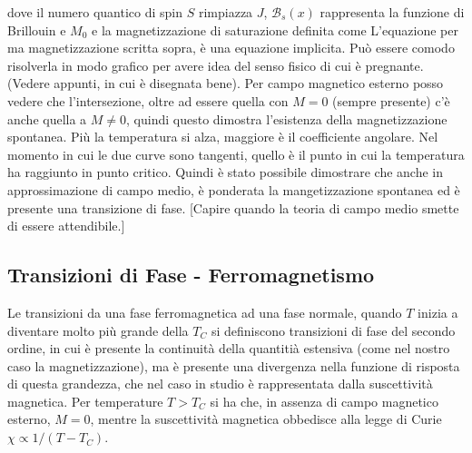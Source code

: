dove il numero quantico di spin $S$ rimpiazza $J$, $\mathcal{B}_s(x) $ rappresenta la funzione di Brillouin e $M_0$ e la magnetizzazione di saturazione definita come 
L'equazione per ma magnetizzazione scritta sopra, \`e una equazione implicita. Pu\`o essere comodo risolverla in modo grafico per avere idea del senso fisico di cui \`e pregnante. (Vedere appunti, in cui \`e disegnata bene). Per campo magnetico esterno posso vedere che l'intersezione, oltre ad essere quella con $M=0$ (sempre presente) c'\`e anche quella a $M\neq 0$, quindi questo dimostra l'esistenza della magnetizzazione spontanea. Pi\`u la temperatura si alza, maggiore \`e il coefficiente angolare. Nel momento in cui le due curve sono tangenti, quello \`e il punto in cui la temperatura ha raggiunto in punto critico. Quindi \`e stato possibile dimostrare che anche in approssimazione di campo medio, \`e ponderata la mangetizzazione spontanea ed \`e presente una transizione di fase. [Capire quando la teoria di campo medio smette di essere attendibile.]
\subsection{Transizioni di Fase - Ferromagnetismo}
Le transizioni da una fase ferromagnetica ad una fase normale, quando $T$ inizia a diventare molto pi\`u grande della $T_C$ si definiscono transizioni di fase del secondo ordine, in cui \`e presente la continuit\`a della quantiti\`a estensiva (come nel nostro caso la magnetizzazione), ma \`e presente una divergenza nella funzione di risposta di questa grandezza, che nel caso in studio \`e rappresentata dalla suscettivit\`a magnetica. Per temperature $T > T_C$ si ha che, in assenza di campo magnetico esterno, $M = 0$, mentre la suscettivit\`a magnetica obbedisce alla legge di Curie $\chi\propto 1/(T-T_C)$.

